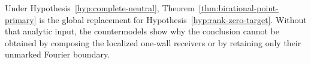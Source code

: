 Under Hypothesis~\ref{hyp:complete-neutral},
Theorem~\ref{thm:birational-point-primary} is the global replacement for
Hypothesis~\ref{hyp:rank-zero-target}.  Without that analytic input, the
countermodels show why the conclusion cannot be obtained by composing the
localized one-wall receivers or by retaining only their unmarked Fourier
boundary.
